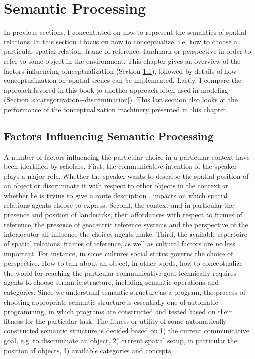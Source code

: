 % 
% 

\chapter{Semantic Processing}
\label{s:german-locative-phrases-semantic-processing}

In previous sections, I concentrated on how to represent the semantics
of spatial relations. In this section I focus on how to conceptualize, 
i.e. how to choose a particular spatial relation, frame of 
reference, landmark or perspective in order to refer to some object
in the environment. This chapter gives an overview of the factors
influencing conceptualization (Section \ref{s:factors-of-conceptualization}),
followed by details of how conceptualization for spatial scenes can
be implemented. Lastly, I compare the approach favored in this
book to another approach often used in modeling 
(Section \ref{s:categorization+discrimination}). This last 
section also looks at the performance of the conceptualization
machinery presented in this chapter.


\section{Factors Influencing Semantic Processing}
\label{s:factors-of-conceptualization}
A number of factors influencing the particular
choice in a particular context have been identified by scholars. 
First, the communicative intention of the speaker plays a major role. 
Whether the speaker wants to describe the spatial position of an 
object or discriminate it with respect to other objects in the context or whether
he is trying to give a route description \citep{tversky1998space},
impacts on which spatial relations agents choose to express.
Second, the context and in particular the presence and position of landmarks,
their affordances with respect to frames of reference, the presence
of geocentric reference systems and the perspective of the interlocutor 
all influence the choices agents make.
Third, the available repertoire of spatial relations, frames of reference,
as well as cultural factors are no less important. For instance, in some cultures 
social status governs the choice of perspective.
How to talk about an object, in other words, how to conceptualize
the world for reaching the particular communicative goal
technically requires agents to choose semantic structure, 
including semantic operations and categories. 
Since we understand semantic structure as a program, the process 
of choosing appropriate semantic structure is essentially one of 
automatic programming, in which programs are constructed and 
tested based on their fitness for the particular task. 
The fitness or utility of some automatically constructed semantic structure 
is decided based on 1) the current communicative goal, e.g. to discriminate an object, 
2) current spatial setup, in particular the position of objects,
3) available categories and concepts.



